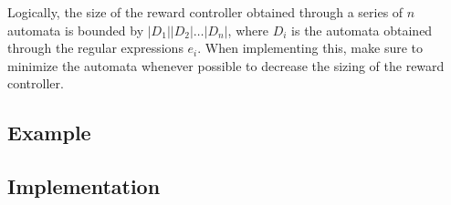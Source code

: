 Logically, the size of the reward controller obtained through a series of $n$ automata is bounded by $|D_1||D_2| \dots  |D_n|$, where $D_i$ is the automata obtained through the regular expressions $e_i$. When implementing this, make sure to minimize the automata whenever possible to decrease the sizing of the reward controller. 

\subsection*{Example}


\subsection*{Implementation}
